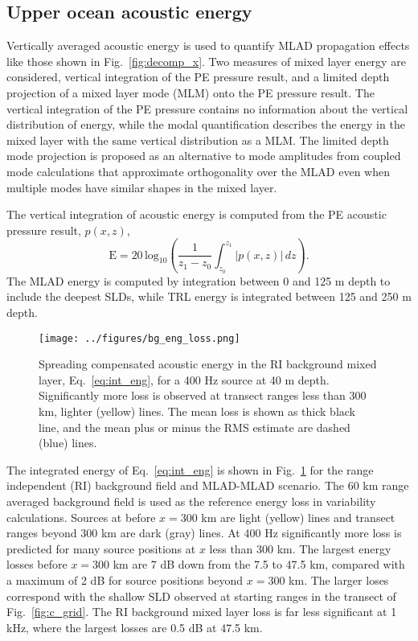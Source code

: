 \documentclass[preprint,NumberedRefs]{JASA}
\begin{document}
\subsection{Upper ocean acoustic energy}\label{ssec:bg}
Vertically averaged acoustic energy is used to quantify MLAD propagation effects like those shown in Fig.~\ref{fig:decomp_x}. Two measures of mixed layer energy are considered, vertical integration of the PE pressure result, and a limited depth projection of a mixed layer mode (MLM) onto the PE pressure result. The vertical integration of the PE pressure contains no information about the vertical distribution of energy, while the modal quantification describes the energy in the mixed layer with the same vertical distribution as a MLM. The limited depth mode projection is proposed as an alternative to mode amplitudes from coupled mode calculations that approximate orthogonality over the MLAD even when multiple modes have similar shapes in the mixed layer.

The vertical integration of acoustic energy is computed from the PE acoustic pressure result, $p(x, z)$,
\begin{equation}
        \textrm{E} = 20 \, \textrm{log}_{10} \left( \frac{1}{z_1 - z_0} \int^{z_1}_{z_0} \left| p(x, z) \right| \,  dz \right).
    \label{eq:int_eng}
\end{equation}
The MLAD energy is computed by integration between 0 and 125 m depth to include the deepest SLDs, while TRL energy is integrated between 125 and 250 m depth.

\begin{figure}
\texttt{[image: ../figures/bg\_eng\_loss.png]}
    \caption{Spreading compensated acoustic energy in the RI background mixed layer, Eq.~\eqref{eq:int_eng}, for a 400 Hz source at 40 m depth. Significantly more loss is observed at transect ranges less than 300 km, lighter (yellow) lines. The mean loss is shown as thick black line, and the mean plus or minus the RMS estimate are dashed (blue) lines.}
    \label{fig:bg_eng}
\end{figure}
The integrated energy of Eq.~\eqref{eq:int_eng} is shown in Fig.~\ref{fig:bg_eng} for the range independent (RI) background field and MLAD-MLAD scenario. The 60 km range averaged background field is used as the reference energy loss in variability calculations. Sources at before $x=$300 km are light (yellow) lines and transect ranges beyond 300 km are dark (gray) lines. At 400 Hz significantly more loss is predicted for many source positions at $x$ less than 300 km. The largest energy losses before $x=300$ km are 7 dB down from the 7.5 to 47.5 km, compared with a maximum of 2 dB for source positions beyond $x=300$ km. The larger loses correspond with the shallow SLD observed at starting ranges in the transect of Fig.~\ref{fig:c_grid}. The RI background mixed layer loss is far less significant at 1 kHz, where the largest losses are 0.5 dB at 47.5 km.
\end{document}
